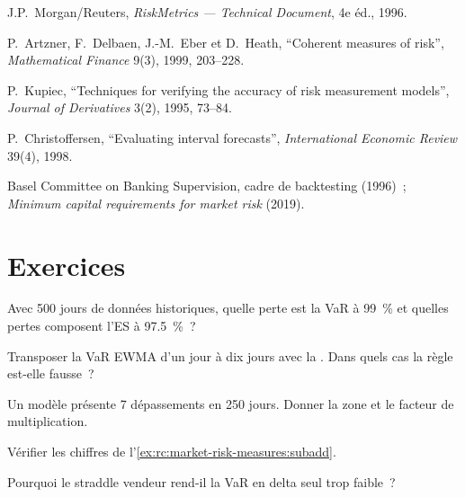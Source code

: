 \begin{omsources}
\item J.P.\ Morgan/Reuters, \emph{RiskMetrics --- Technical Document}, 4e éd., 1996.
\item P.\ Artzner, F.\ Delbaen, J.-M.\ Eber et D.\ Heath, ``Coherent measures of risk'',
\emph{Mathematical Finance} 9(3), 1999, 203--228.
\item P.\ Kupiec, ``Techniques for verifying the accuracy of risk measurement models'',
\emph{Journal of Derivatives} 3(2), 1995, 73--84.
\item P.\ Christoffersen, ``Evaluating interval forecasts'', \emph{International Economic Review}
39(4), 1998.
\item Basel Committee on Banking Supervision, cadre de backtesting (1996)~; \emph{Minimum capital
requirements for market risk} (2019).
\end{omsources}

\section{Exercices}

\begin{exercise}[$\star$]\label{exo:rc:market-risk-measures:1}
Avec 500 jours de données historiques, quelle perte est la VaR à 99~\% et quelles pertes composent l'ES à 97.5~\%~?
\end{exercise}

\begin{exercise}[$\star$]\label{exo:rc:market-risk-measures:2}
Transposer la VaR EWMA d'un jour à dix jours avec la . Dans quels cas la
règle est-elle fausse~?
\end{exercise}

\begin{exercise}[$\star$]\label{exo:rc:market-risk-measures:3}
Un modèle présente 7 dépassements en 250 jours. Donner la zone et le facteur de multiplication.
\end{exercise}

\begin{exercise}[$\star\star$]\label{exo:rc:market-risk-measures:4}
Vérifier les chiffres de l'\cref{ex:rc:market-risk-measures:subadd}.
\end{exercise}

\begin{exercise}[$\star\star$]\label{exo:rc:market-risk-measures:5}
Pourquoi le straddle vendeur rend-il la VaR en delta seul trop faible~?
\end{exercise}

